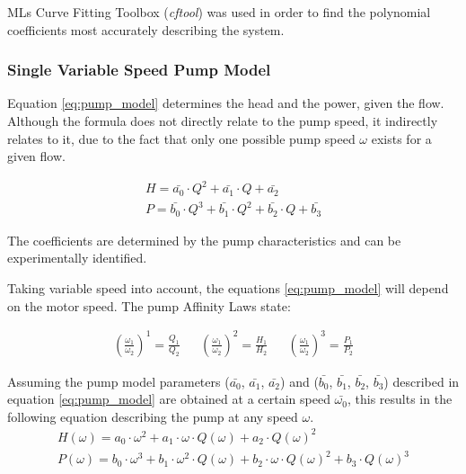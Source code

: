 MLs Curve Fitting Toolbox (\textit{cftool}) \cite{cftool}
was used in order to find the polynomial coefficients most accurately describing the system.

\subsubsection{Single Variable Speed Pump Model}
Equation \ref{eq:pump_model} determines the head and the power, given the flow. 
Although the formula does not directly relate to the pump speed, it indirectly relates to it, due to the fact that only one possible 
pump speed $\omega$ exists for a given flow.

\begin{equation}
	\begin{aligned}
	H = \bar{a_{0}} \cdot Q^2 + \bar{a_{1}} \cdot Q + \bar{a_{2}} \\
	P = \bar{b_{0}} \cdot Q^3 + \bar{b_{1}} \cdot Q^2 + \bar{b_{2}} \cdot Q + \bar{b_{3}}
	\end{aligned}
	\label{eq:pump_model}
\end{equation}

The coefficients are determined by the pump characteristics and can be experimentally identified.

Taking variable speed into account, the equations \ref{eq:pump_model} will depend on the motor speed. 
The pump Affinity Laws state:

\begin{align}
	\left(\frac{\omega_1}{\omega_2}\right)^1 = \frac{Q_1}{Q_2} && 
	\left(\frac{\omega_1}{\omega_2}\right)^2 = \frac{H_1}{H_2} &&
	\left(\frac{\omega_1}{\omega_2}\right)^3 = \frac{P_1}{P_2}	
\end{align}

\newpage
Assuming the pump model parameters ($\bar{a_{0}}$, $\bar{a_{1}}$, $\bar{a_{2}}$) and ($\bar{b_{0}}$, $\bar{b_{1}}$, $\bar{b_{2}}$, $\bar{b_{3}}$) 
described in equation \ref{eq:pump_model} are obtained at a certain speed $\bar{\omega_{0}}$, 
this results in the following equation describing the pump at any speed $\omega$.
\begin{equation}
	\begin{aligned}
	H(\omega) = a_0 \cdot \omega^2 + a_1 \cdot \omega \cdot Q(\omega) + a_2 \cdot Q(\omega)^2 \\
	P(\omega) = b_0 \cdot \omega^3 + b_1 \cdot \omega^2 \cdot Q(\omega) + b_2 \cdot \omega \cdot Q(\omega)^2 + b_3 \cdot Q(\omega)^3
	\end{aligned}
\end{equation}


